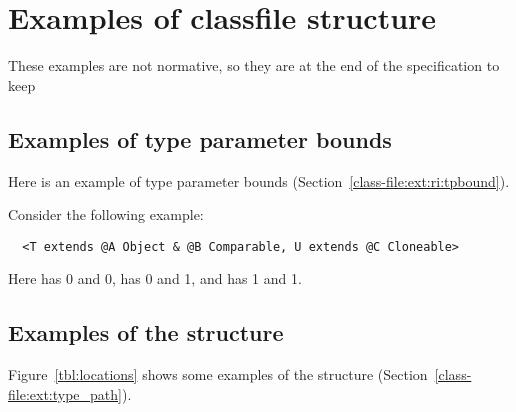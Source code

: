 \documentclass[10pt]{article}
\newcommand{\preverbnegspace}{\vspace{-5pt}}
\begin{document}

\label{page:non-normative-start}

\appendix


\section{Examples of classfile structure\label{classfile-examples}}

These examples are not normative, so they are at the end of the
specification to keep


\subsection{Examples of type parameter bounds\label{classfile-examples-type-parameter-bounds}}

Here is an example of type parameter bounds
(Section~\ref{class-file:ext:ri:tpbound}).

Consider the following
example:

\preverbnegspace
\begin{Verbatim}
  <T extends @A Object & @B Comparable, U extends @C Cloneable>
\end{Verbatim}

\noindent
Here
 has  0 and  0,
 has  0 and  1, and
 has  1 and  1.


\subsection{Examples of the  structure\label{classfile-examples-type_path}}

Figure~\ref{tbl:locations} shows some examples of the 
structure (Section~\ref{class-file:ext:type_path}).
\end{document}
